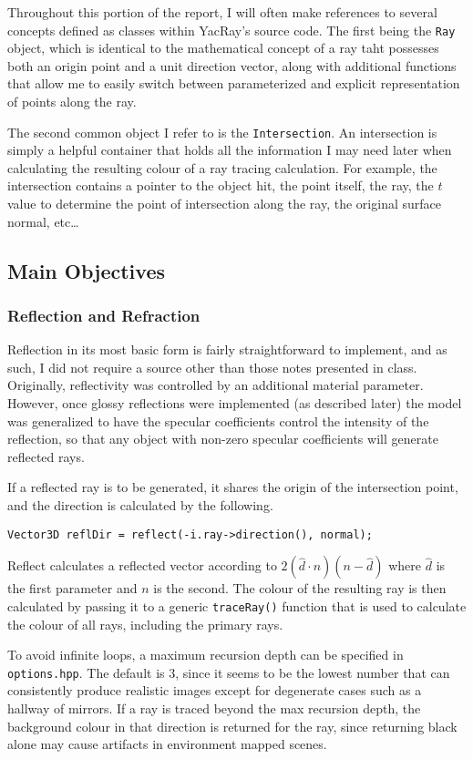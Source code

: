 \documentclass[12pt]{article}
\begin{document}
Throughout this portion of the report, I will often make references to several concepts defined as classes within YacRay's source code. The first being the \texttt{Ray} object, which is identical to the mathematical concept of a ray taht possesses both an origin point and a unit direction vector, along with additional functions that allow me to easily switch between parameterized and explicit representation of points along the ray.

The second common object I refer to is the \texttt{Intersection}. An intersection is simply a helpful container that holds all the information I may need later when calculating the resulting colour of a ray tracing calculation. For example, the intersection contains a pointer to the object hit, the point itself, the ray, the $t$ value to determine the point of intersection along the ray, the original surface normal, etc\dots

\subsection{Main Objectives}

\subsubsection{Reflection and Refraction}
Reflection in its most basic form is fairly straightforward to implement, and as such, I did not require a source other than those notes presented in class. Originally, reflectivity was controlled by an additional material parameter. However, once glossy reflections were implemented (as described later) the model was generalized to have the specular coefficients control the intensity of the reflection, so that any object with non-zero specular coefficients will generate reflected rays. 

If a reflected ray is to be generated, it shares the origin of the intersection point, and the direction is calculated by the following.

\texttt{Vector3D reflDir = reflect(-i.ray->direction(), normal);}

Reflect calculates a reflected vector according to $2(\hat{d}\cdot n)(n - \hat{d})$ where $\hat{d}$ is the first parameter and $n$ is the second. The colour of the resulting ray is then calculated by passing it to a generic \texttt{traceRay()} function that is used to calculate the colour of all rays, including the primary rays.

To avoid infinite loops, a maximum recursion depth can be specified in \texttt{options.hpp}. The default is 3, since it seems to be the lowest number that can consistently produce realistic images except for degenerate cases such as a hallway of mirrors. If a ray is traced beyond the max recursion depth, the background colour in that direction is returned for the ray, since returning black alone may cause artifacts in environment mapped scenes.
\end{document}
